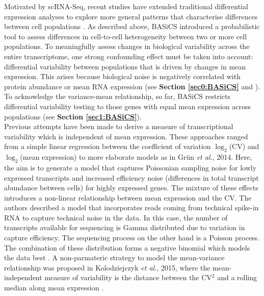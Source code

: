 Motivated by scRNA-Seq, recent studies have extended traditional differential expression analyses to explore more general patterns that characterise differences between cell populations \citep[e.g.~][]{Korthauer2016}. As described above, BASiCS \citep{Vallejos2015BASiCS,Vallejos2016} introduced a probabilistic tool to assess differences in cell-to-cell heterogeneity between two or more cell populations. To meaningfully assess changes in biological variability across the entire transcriptome, one strong confounding effect must be taken into account: differential variability between populations that is driven by changes in mean expression. This arises because biological noise is negatively correlated with protein abundance \citep{Bar-Even2006, Newman2006, Taniguchi2011} or mean RNA expression (see \textbf{Section \ref{sec0:BASiCS}} and \citep{Brennecke2013, Antolovic2017}). To acknowledge the variance-mean relationship, so far, BASiCS restricts differential variability testing to those genes with equal mean expression across populations (see \textbf{Section \ref{sec1:BASiCS}}). \\

Previous attempts have been made to derive a measure of transcriptional variability which is independent of mean expression. These approaches ranged from a simple linear regression between the coefficient of variation $\log_2$(CV) and $\log_2$(mean expression) \citep{Wu2017} to more elaborate models as in Gr\"un \emph{et al.}, 2014. Here, the aim is to generate a model that captures Poissonian sampling noise for lowly expressed transcripts and increased efficiency noise (differences in total transcript abundance between cells) for highly expressed genes. The mixture of these effects introduces a non-linear relationship between mean expression and the CV. The authors described a model that incorporates reads coming from technical spike-in RNA to capture technical noise in the data. In this case, the number of transcripts available for sequencing is Gamma distributed due to variation in capture efficiency. The sequencing process on the other hand is a Poisson process. The combination of these distribution forms a negative binomial which models the data best \cite{Grun2014}. A non-parmateric strategy to model the mean-variance relationship was proposed in Kolodziejczyk \emph{et al.}, 2015, where the mean-independent measure of variability is the distance between the CV$^2$ and a rolling median along mean expression \citep{Kolodziejczyk2015cell}.\\

